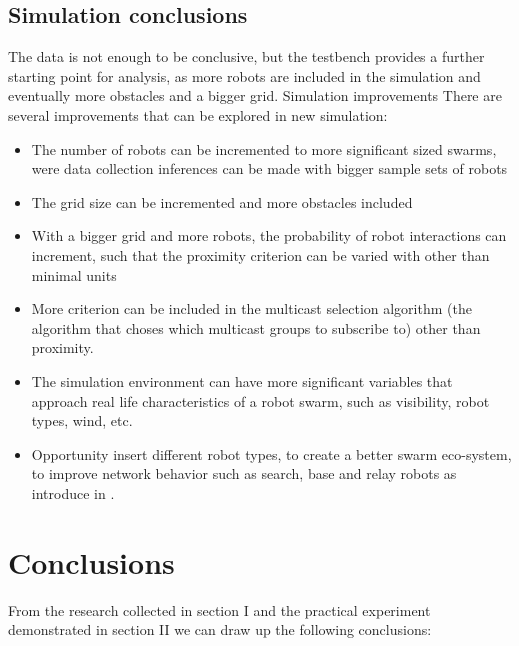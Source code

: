 \documentclass[journal]{IEEEtran}
\begin{document}
\subsection{Simulation conclusions}
The data is not enough to be conclusive, but the testbench provides a further starting point for analysis, as more robots are included in the simulation and eventually more obstacles and a bigger grid. 
Simulation improvements
There are several improvements that can be explored in new simulation:
\begin{itemize}
\item	The number of robots can be incremented to more significant sized swarms, were data collection inferences can be made with bigger sample sets of robots
\item	The grid size can be incremented and more obstacles included
\item	With a bigger grid and more robots, the probability of robot interactions can increment, such that the proximity criterion can be varied with other than minimal units
\item	More criterion can be included in the multicast selection algorithm (the algorithm that choses which multicast groups to subscribe to) other than proximity. 
\item	The simulation environment can have more significant variables that approach real life characteristics of a robot swarm, such as visibility, robot types, wind, etc.
\item	Opportunity insert different robot types, to create a better swarm eco-system, to improve network behavior such as search, base and relay robots as introduce in \cite{IG5}.
\end{itemize}

\section{Conclusions}

From the research collected in section I and the practical experiment demonstrated in section II we can draw up the following conclusions:
\end{document}
